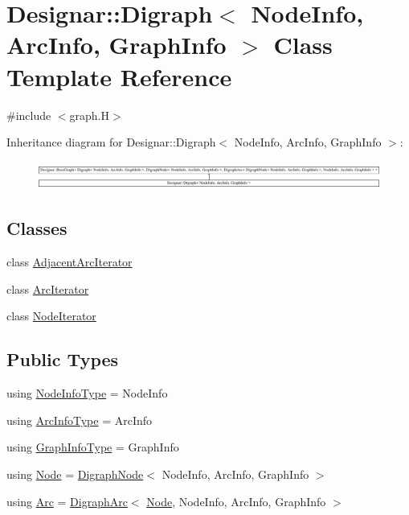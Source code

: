 \hypertarget{class_designar_1_1_digraph}{}\section{Designar\+:\+:Digraph$<$ Node\+Info, Arc\+Info, Graph\+Info $>$ Class Template Reference}
\label{class_designar_1_1_digraph}


{\ttfamily \#include $<$graph.\+H$>$}

Inheritance diagram for Designar\+:\+:Digraph$<$ Node\+Info, Arc\+Info, Graph\+Info $>$\+:\begin{figure}[H]
\begin{center}
\leavevmode
\includegraphics[height=0.921053cm]{class_designar_1_1_digraph}
\end{center}
\end{figure}
\subsection*{Classes}
\begin{DoxyCompactItemize}
\item 
class \hyperlink{class_designar_1_1_digraph_1_1_adjacent_arc_iterator}{Adjacent\+Arc\+Iterator}
\item 
class \hyperlink{class_designar_1_1_digraph_1_1_arc_iterator}{Arc\+Iterator}
\item 
class \hyperlink{class_designar_1_1_digraph_1_1_node_iterator}{Node\+Iterator}
\end{DoxyCompactItemize}
\subsection*{Public Types}
\begin{DoxyCompactItemize}
\item 
using \hyperlink{class_designar_1_1_digraph_a6438608ff27cb6f017705e18bd7fc478}{Node\+Info\+Type} = Node\+Info
\item 
using \hyperlink{class_designar_1_1_digraph_a84a736f6c32da0fcbd1d047e74264d00}{Arc\+Info\+Type} = Arc\+Info
\item 
using \hyperlink{class_designar_1_1_digraph_a2baffbb176ff86becd7452d2acc0ca74}{Graph\+Info\+Type} = Graph\+Info
\item 
using \hyperlink{class_designar_1_1_digraph_a4dc921c41a480b7946a04170e997d8ae}{Node} = \hyperlink{class_designar_1_1_digraph_node}{Digraph\+Node}$<$ Node\+Info, Arc\+Info, Graph\+Info $>$
\item 
using \hyperlink{class_designar_1_1_digraph_a0ceb278671f2a535c00fddccdeafd69f}{Arc} = \hyperlink{class_designar_1_1_digraph_arc}{Digraph\+Arc}$<$ \hyperlink{class_designar_1_1_digraph_a4dc921c41a480b7946a04170e997d8ae}{Node}, Node\+Info, Arc\+Info, Graph\+Info $>$
\end{DoxyCompactItemize}
